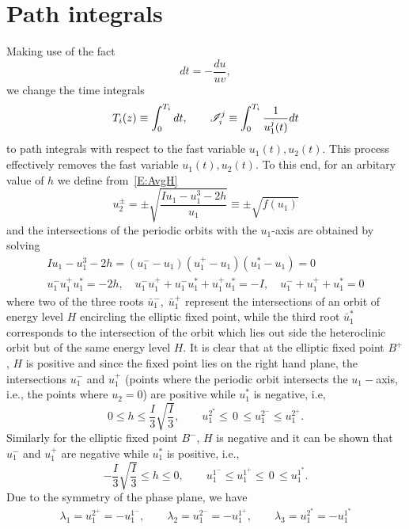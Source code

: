 \section{Path integrals}
\label{A:autoparam path_integrals}

Making use of the fact
\[
dt = -\frac{du}{uv},
\]
we change the time integrals
\[
{T_{i}(z)}\equiv\int_0^{T_{i}} dt, \qquad \mathscr I_{i}^{j}\equiv\int_0^{T_{i}} \frac{1}{u_1^j(t)}dt
\] 
to path integrals with respect to the fast variable $u_1(t),u_2(t)$. This process effectively removes the fast variable $u_1(t),u_2(t)$. To this end, for an arbitary value of $h$ we define from~\eqref{E:AvgH}
\begin{equation}
u_2^{\pm}= \pm \sqrt{\frac{I u_1 - u_1^3 - 2 h}{u_1}} \equiv \pm\sqrt{f(u_1)}
\end{equation}
and the intersections of the periodic orbits with the $u_1$-axis are obtained by solving
\begin{equation}\label{E:roots}
\begin{aligned} 
I u_1 - u_1^3 - 2 h = (u_1^- - u_1)(u_1^+ - u_1)(u_1^* - u_1) = 0\\
u_1^- u_1^+ u_1^* = - 2 h, \quad u_1^- u_1^+ + u_1^- u_1^* + u_1^+ u_1^* = -I,\quad u_1^- + u_1^+ + u_1^* = 0
\end{aligned}
\end{equation}
where two of the three roots $\bar{u}_1^{-},\;\bar{u}_1^{+}$ represent the intersections of an orbit of energy level $H$ encircling the elliptic fixed point, while the third root $\bar{u}_1^{*}$ corresponds to the intersection of the orbit which lies out side the heteroclinic orbit but of the same energy level $H$. It is clear that at the elliptic fixed point $B^+$, $H$ is positive and since the fixed point lies on the right hand plane, the intersections $u_1^{-}$ and $u_1^{+}$ (points where the periodic orbit intersects the $u_1-$axis, i.e., the points where $u_2 = 0$) are positive while $u_1^{*}$ is negative, i.e,
\[
0 \leqslant h \leqslant \frac{I}{3}\sqrt{\frac{I}{3}}, \qquad u_1^{{2}^{*}} \leqslant
\, 0 \, \leqslant u_1^{2^-} \leqslant u_1^{2^+}.
\]
Similarly for the elliptic fixed point $B^-$, $H$ is negative and it can be shown that $u_1^-$ and $u_1^+$ are negative while $u_1^{*}$ is positive, i.e.,
\[
-\frac{I}{3}\sqrt{\frac{I}{3}} \leqslant h \leqslant 0, \qquad u_1^{{1}^{-}} \le
u_1^{{1}^{+}} \leqslant \, 0 \, \leqslant u_1^{{1}^{*}}.
\]
Due to the symmetry of the phase plane, we have
\begin{equation}
\begin{aligned} 
\lambda_1=u_1^{{2}^{+}}=-u_1^{{1}^{-}},\qquad \lambda_2=u_1^{{2}^{-}}=-u_1^{{1}^{+}},\qquad \lambda_3=u_1^{{2}^{*}}=-u_1^{{1}^{*}}
\end{aligned}\label{E:intersects}
\end{equation}
